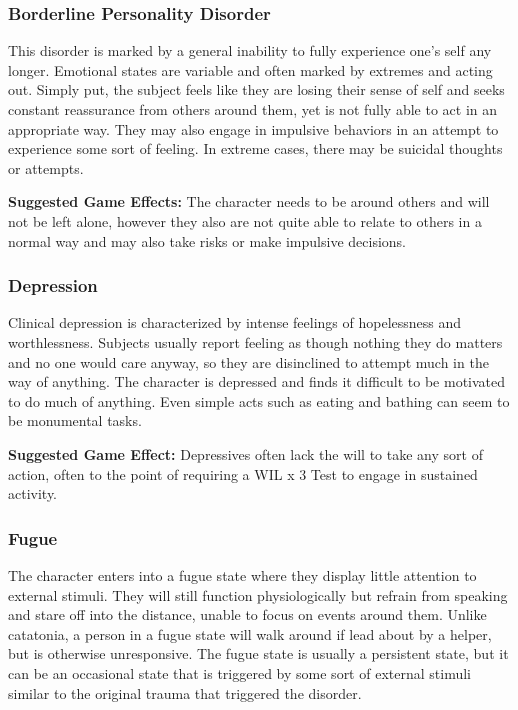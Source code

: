 \subsubsection{Borderline Personality Disorder}

This disorder is marked by a general inability to fully 
experience one's self any longer. Emotional states are 
variable and often marked by extremes and acting 
out. Simply put, the subject feels like they are losing 
their sense of self and seeks constant reassurance 
from others around them, yet is not fully able to act 
in an appropriate way. They may also engage in impulsive
behaviors in an attempt to experience some
sort of feeling. In extreme cases, there may be suicidal 
thoughts or attempts.

\textbf{Suggested Game Effects: }The character needs to 
be around others and will not be left alone, however 
they also are not quite able to relate to others in a 
normal way and may also take risks or make impulsive
decisions.

\subsubsection{Depression}

Clinical depression is characterized by intense feelings 
of hopelessness and worthlessness. Subjects usually 
report feeling as though nothing they do matters and 
no one would care anyway, so they are disinclined to 
attempt much in the way of anything. The character is 
depressed and finds it difficult to be motivated to do 
much of anything. Even simple acts such as eating and 
bathing can seem to be monumental tasks.

\textbf{Suggested Game Effect:} Depressives often lack the 
will to take any sort of action, often to the point of requiring
a WIL x 3 Test to engage in sustained activity.

\subsubsection{Fugue}

The character enters into a fugue state where they 
display little attention to external stimuli. They will 
still function physiologically but refrain from speaking
and stare off into the distance, unable to focus on
events around them. Unlike catatonia, a person in a 
fugue state will walk around if lead about by a helper, 
but is otherwise unresponsive. The fugue state is usually
a persistent state, but it can be an occasional state
that is triggered by some sort of external stimuli similar
to the original trauma that triggered the disorder.

